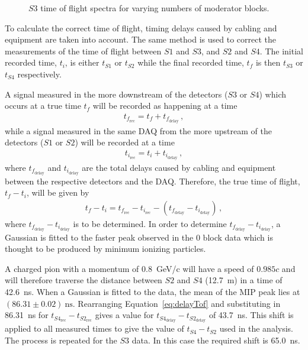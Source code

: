 \begin{figure}[ht]
  \begin{adjustbox}{max totalsize={.8\textwidth}{.5\textheight},center}
    
  \end{adjustbox}
  \caption{$\mathit{S3}$ time of flight spectra for varying numbers of moderator blocks.}
  \label{fig:s3tof}
\end{figure}

To calculate the correct time of flight, timing delays caused by cabling and equipment are taken into account.
The same method is used to correct the measurements of the time of flight between $\mathit{S1}$ and $\mathit{S3}$, and $\mathit{S2}$ and $\mathit{S4}$.
The initial recorded time, $t_i$, is either $t_{\mathit{S1}}$ or $t_{\mathit{S2}}$ while the final recorded time, $t_f$ is then $t_{\mathit{S3}}$ or $t_{\mathit{S4}}$ respectively.

A signal measured in the more downstream of the detectors ($\mathit{S3}$ or $\mathit{S4}$) which occurs at a true time $t_f$ will be recorded as happening at a time
\begin{align}
  t_{f_{\text{rec}}} = t_f + t_{f_{\text{delay}}} \,,
  \label{eq:delayS4}
\end{align}
while a signal measured in the same DAQ from the more upstream of the detectors ($\mathit{S1}$ or $\mathit{S2}$) will be recorded at a time
\begin{align}
  t_{i_{\text{rec}}} = t_{i} + t_{i_{\text{delay}}} \,,
  \label{eq:delayS2}
\end{align}
where $t_{f_{\text{delay}}}$ and $t_{i_{\text{delay}}}$ are the total delays caused by cabling and equipment between the respective detectors and the DAQ.
Therefore, the true time of flight, $t_{f} - t_{i}$, will be given by
\begin{align}
  t_{f} - t_{i} = t_{f_{\text{rec}}} - t_{i_{\text{rec}}} - \left( t_{f_{\text{delay}}} - t_{i_{\text{delay}}} \right) \,,
  \label{eq:delayTof}
\end{align}
where $t_{f_{\text{delay}}} - t_{i_{\text{delay}}}$ is to be determined.
In order to determine $t_{f_{\text{delay}}} - t_{i_{\text{delay}}}$, a Gaussian is fitted to the faster peak observed in the 0 block data which is thought to be produced by minimum ionizing particles.

A charged pion with a momentum of 0.8~GeV/c will have a speed of $0.985c$ and will therefore traverse the distance between $\mathit{S2}$ and $\mathit{S4}$ (12.7~m) in a time of 42.6~ns.
When a Gaussian is fitted to the data, the mean of the MIP peak lies at $(86.31 \pm 0.02)~\text{ns}$.
Rearranging Equation~\ref{eq:delayTof} and substituting in 86.31~ns for $t_{\mathit{S4}_{\text{rec}}} - t_{\mathit{S2}_{\text{rec}}}$ gives a value for $t_{\mathit{S4}_{\text{delay}}} - t_{\mathit{S2}_{\text{delay}}}$ of 43.7~ns.
This shift is applied to all measured times to give the value of $t_{\mathit{S4}} - t_{\mathit{S2}}$ used in the analysis.
The process is repeated for the $\mathit{S3}$ data.
In this case the required shift is 65.0~ns.

